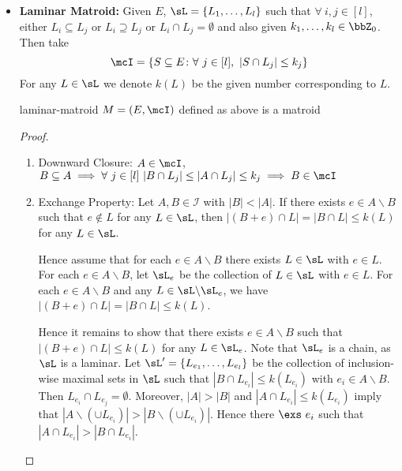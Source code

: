 \begin{itemize}[label=$\bullet$]
\begin{proof}
\begin{enumerate}[label=\bfseries\tiny\protect\circled{\small\arabic*}]
	\end{enumerate}Therefore $M$ is a matroid
\end{proof}
\item \textbf{Laminar Matroid:} Given $E$, $\sL=\{L_1,\dots,L_l\}$ such that $\forall\ i,j\in [l]$, either $L_i\subseteq L_j$ or $L_i\supseteq L_j$ or $L_i\cap L_j=\emptyset$ and also given $k_1,\dots, k_l\in \bbZ_0$. Then take $$\mcI=\{S\subseteq E\colon \forall \ j\in[l],\ |S\cap L_j|\leq k_j\}$$For any $L\in\sL$ we denote $k(L)$ be the given number corresponding to $L$.
\begin{lemma}{}{laminar-matroid}
	$M=(E,\mcI)$ defined as above is a matroid
\end{lemma}
\begin{proof}
	\begin{enumerate}[label=\bfseries\tiny\protect\circled{\small\arabic*}]
		\item Downward Closure: $A\in \mcI$, $B\subseteq A\implies \forall\ j\in[l]\ |B\cap L_j|\leq |A\cap L_j|\leq k_j\implies B\in \mcI$
		\item Exchange Property: \parinn Let $A,B\in \mathcal{I}$ with $|B|<|A|$.	If there exists $e\in A\backslash B$ such that $e\notin L$ for any $L\in\sL$, then $|(B+e)\cap L|=|B\cap L|\leq k(L)$ for any $L\in\sL$.
		
		Hence assume that for each $e\in A\backslash B$ there exists $L\in\sL$ with $e\in L$.
		For each $e\in A\backslash B$, let $\sL_e$ be the collection of $L\in\sL$ with $e\in L$.
		For each $e\in A\backslash B$ and any $L\in\sL\backslash\sL_e$, we have $|(B+e)\cap L|=|B\cap L|\leq k(L)$.
		
		Hence it remains to show that there exists $e\in A\backslash B$ such that $|(B+e)\cap L|\leq k(L)$ for any $L\in\sL_e$.
		Note that $\sL_e$ is a chain, as $\sL$ is a laminar.
		Let $\sL'=\{L_{e_1},\ldots,L_{e_l}\}$ be the collection of inclusion-wise maximal sets in $\sL$ such that $|B\cap L_{e_i}|\leq k(L_{e_i})$ with $e_i\in A\backslash B$.
		Then $L_{e_i}\cap L_{e_j}=\emptyset$. Moreover, $|A|>|B|$ and $|A\cap L_{e_i}|\leq k(L_{e_i})$ imply that $|A\backslash (\cup L_{e_i})|>|B\backslash (\cup L_{e_i})|$. Hence there $\exs\ e_i$ such that $|A\cap L_{e_i}|>|B\cap L_{e_i}|$.
		

\end{enumerate}
\end{proof}
\end{itemize}

